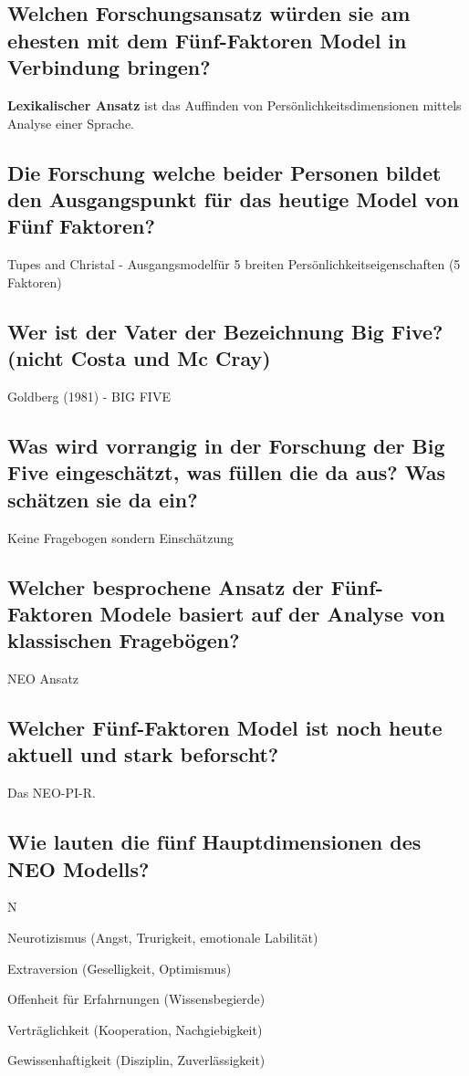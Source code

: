 \documentclass[a6paper,9pt,DIV=14]{scrartcl}
\begin{document}
\subsection{Welchen Forschungsansatz würden sie am ehesten mit dem Fünf-Faktoren Model in Verbindung bringen?} %
    \textbf{Lexikalischer Ansatz} ist das Auffinden von Persönlichkeitsdimensionen mittels Analyse einer Sprache.
\subsection{Die Forschung welche beider Personen bildet den Ausgangspunkt für das heutige Model von Fünf Faktoren?}
    Tupes and Christal - Ausgangsmodelfür 5 breiten Persönlichkeitseigenschaften (5 Faktoren)
\subsection{Wer ist der Vater der Bezeichnung Big Five? (nicht Costa und Mc Cray)}
    Goldberg (1981) - BIG FIVE
\subsection{Was wird vorrangig in der Forschung der Big Five eingeschätzt, was füllen die da aus? Was schätzen sie da ein?}
    Keine Fragebogen sondern Einschätzung
\subsection{Welcher besprochene Ansatz der Fünf-Faktoren Modele basiert auf der Analyse von klassischen Fragebögen?} %
    NEO Ansatz
\subsection{Welcher Fünf-Faktoren Model ist noch heute aktuell und stark beforscht?}
    Das NEO-PI-R.
\subsection{Wie lauten die fünf Hauptdimensionen des NEO Modells?} %
    \begin{labeling}{N}
        \item [N] Neurotizismus (Angst, Trurigkeit, emotionale Labilität)
        \item [E] Extraversion (Geselligkeit, Optimismus)
        \item [O] Offenheit für Erfahrnungen (Wissensbegierde)
        \item [A] Verträglichkeit (Kooperation, Nachgiebigkeit)
        \item [C] Gewissenhaftigkeit (Disziplin, Zuverlässigkeit)
    \end{labeling}
\end{document}
